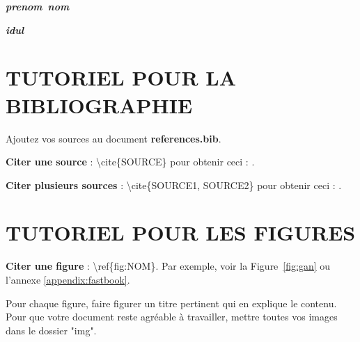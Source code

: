 \documentclass[12pt]{article}
\newcommand{\prenomEtudiant}{\textit{prenom}}
\newcommand{\nomEtudiant}{\textit{nom}}
\newcommand{\idul}{\textit{idul}}
\begin{document}
	\begin{minipage}[t]{6cm}
		\begin{flushleft}
			\textbf{\prenomEtudiant~\nomEtudiant}\\
		\end{flushleft}
	\end{minipage}
	\begin{minipage}[t]{10cm}
		\begin{flushright}
			\hspace*{1cm}\textbf{\idul} \\
		\end{flushright}
	\end{minipage}

	\newpage

	\newpage
	\tableofcontents

	\newpage
	\listoftables

	\newpage
	\listoffigures

	\newpage
	
	\break

	\newpage

	

	\section{TUTORIEL POUR LA BIBLIOGRAPHIE}
	Ajoutez vos sources au document \textbf{references.bib}.

	\textbf{Citer une source} : \textbackslash cite\{SOURCE\} pour obtenir ceci :
	\cite{howard2020deep}.

	\textbf{Citer plusieurs sources} : \textbackslash cite\{SOURCE1, SOURCE2\} pour obtenir
	ceci : \cite{goodfellow2014generative, CycleGAN2017}.
	\section{TUTORIEL POUR LES FIGURES}

	\textbf{Citer une figure} : \textbackslash ref\{fig:NOM\}. Par exemple, voir la Figure~\ref{fig:gan}
	ou l'annexe \ref{appendix:fastbook}.

	Pour chaque figure, faire figurer un titre pertinent qui en explique le contenu. Pour que
	votre document reste agréable à travailler, mettre toutes vos images dans le dossier "img".
\end{document}
